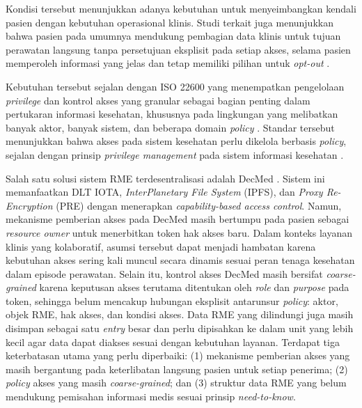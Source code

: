 Kondisi tersebut menunjukkan adanya kebutuhan untuk menyeimbangkan kendali pasien dengan kebutuhan operasional klinis. Studi terkait juga menunjukkan bahwa pasien pada umumnya mendukung pembagian data klinis untuk tujuan perawatan langsung tanpa persetujuan eksplisit pada setiap akses, selama pasien memperoleh informasi yang jelas dan tetap memiliki pilihan untuk \textit{opt-out} \autocite{jones2022public}.

Kebutuhan tersebut sejalan dengan ISO 22600 yang menempatkan pengelolaan \textit{privilege} dan kontrol akses yang granular sebagai bagian penting dalam pertukaran informasi kesehatan, khususnya pada lingkungan yang melibatkan banyak aktor, banyak sistem, dan beberapa domain \textit{policy} \autocite{ISO_22600_2}. Standar tersebut menunjukkan bahwa akses pada sistem kesehatan perlu dikelola berbasis \textit{policy}, sejalan dengan prinsip \textit{privilege management} pada sistem informasi kesehatan \autocite{ISO_22600_2}.

Salah satu solusi sistem RME terdesentralisasi adalah DecMed \autocite{sadewa2025decmed}. Sistem ini memanfaatkan DLT IOTA, \textit{InterPlanetary File System} (IPFS), dan \textit{Proxy Re-Encryption} (PRE) dengan menerapkan \textit{capability-based access control}. Namun, mekanisme pemberian akses pada DecMed masih bertumpu pada pasien sebagai \textit{resource owner} untuk menerbitkan token hak akses baru. Dalam konteks layanan klinis yang kolaboratif, asumsi tersebut dapat menjadi hambatan karena kebutuhan akses sering kali muncul secara dinamis sesuai peran tenaga kesehatan dalam episode perawatan. Selain itu, kontrol akses DecMed masih bersifat \textit{coarse-grained} karena keputusan akses terutama ditentukan oleh \textit{role} dan \textit{purpose} pada token, sehingga belum mencakup hubungan eksplisit antarunsur \textit{policy}: aktor, objek RME, hak akses, dan kondisi akses. Data RME yang dilindungi juga masih disimpan sebagai satu \textit{entry} besar dan perlu dipisahkan ke dalam unit yang lebih kecil agar data dapat diakses sesuai dengan kebutuhan layanan. Terdapat tiga keterbatasan utama yang perlu diperbaiki: (1) mekanisme pemberian akses yang masih bergantung pada keterlibatan langsung pasien untuk setiap penerima; (2) \textit{policy} akses yang masih \textit{coarse-grained}; dan (3) struktur data RME yang belum mendukung pemisahan informasi medis sesuai prinsip \textit{need-to-know}.

